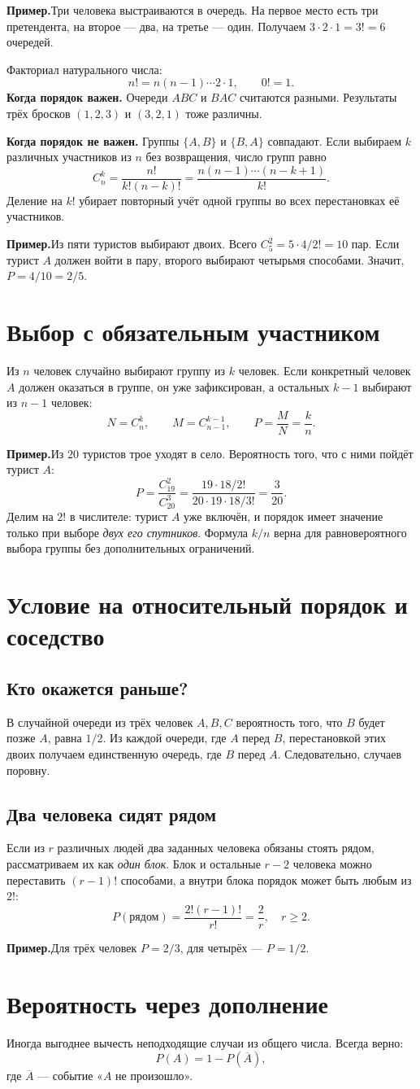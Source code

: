 \documentclass[a4paper,12pt]{article}
\newcommand{\key}[1]{\textcolor{darkaccent}{\textbf{#1}}}
\newcommand{\sample}[1]{\par\medskip\textcolor{darkaccent}{\textbf{Пример.}}\quad #1\par}
\newcommand{\sect}[1]{\section{#1}\vspace{-3pt}}
\newcommand{\subsect}[1]{\subsection*{\textcolor{darkaccent}{#1}}\vspace{-8pt}}
\begin{document}
\sample{Три человека выстраиваются в очередь. На первое место есть три претендента, на второе --- два, на третье --- один. Получаем $3\cdot2\cdot1=3!=6$ очередей.}

Факториал натурального числа:
\[
n!=n(n-1)\cdots2\cdot1,\qquad 0!=1.
\]
\key{Когда порядок важен.} Очереди $ABC$ и $BAC$ считаются разными. Результаты трёх бросков $(1,2,3)$ и $(3,2,1)$ тоже различны.

\key{Когда порядок не важен.} Группы $\{A,B\}$ и $\{B,A\}$ совпадают. Если выбираем $k$ различных участников из $n$ без возвращения, число групп равно
\[
\boxed{C_n^k=\frac{n!}{k!(n-k)!}=\frac{n(n-1)\cdots(n-k+1)}{k!}}.
\]
Деление на $k!$ убирает повторный учёт одной группы во всех перестановках её участников.

\sample{Из пяти туристов выбирают двоих. Всего $C_5^2=5\cdot4/2!=10$ пар. Если турист $A$ должен войти в пару, второго выбирают четырьмя способами. Значит, $P=4/10=2/5$.}

\clearpage
\sect{Выбор с обязательным участником}
Из $n$ человек случайно выбирают группу из $k$ человек. Если конкретный человек $A$ должен оказаться в группе, он уже зафиксирован, а остальных $k-1$ выбирают из $n-1$ человек:
\[
N=C_n^k,\qquad M=C_{n-1}^{k-1},\qquad\boxed{P=\frac{M}{N}=\frac{k}{n}}.
\]
\sample{Из $20$ туристов трое уходят в село. Вероятность того, что с ними пойдёт турист $A$:
\[
P=\frac{C_{19}^{2}}{C_{20}^{3}}=
\frac{19\cdot18/2!}{20\cdot19\cdot18/3!}=\boxed{\frac{3}{20}}.
\]
Делим на $2!$ в числителе: турист $A$ уже включён, и порядок имеет значение только при выборе \emph{двух его спутников}. Формула $k/n$ верна для равновероятного выбора группы без дополнительных ограничений.}

\sect{Условие на относительный порядок и соседство}
\subsect{Кто окажется раньше?}
В случайной очереди из трёх человек $A,B,C$ вероятность того, что $B$ будет позже $A$, равна $1/2$. Из каждой очереди, где $A$ перед $B$, перестановкой этих двоих получаем единственную очередь, где $B$ перед $A$. Следовательно, случаев поровну.

\subsect{Два человека сидят рядом}
Если из $r$ различных людей два заданных человека обязаны стоять рядом, рассматриваем их как \emph{один блок}. Блок и остальные $r-2$ человека можно переставить $(r-1)!$ способами, а внутри блока порядок может быть любым из $2!$:
\[
P(\text{рядом})=\frac{2!(r-1)!}{r!}=\boxed{\frac{2}{r}},\quad r\ge2.
\]
\sample{Для трёх человек $P=2/3$, для четырёх --- $P=1/2$.}

\clearpage
\sect{Вероятность через дополнение}
Иногда выгоднее вычесть неподходящие случаи из общего числа. Всегда верно:
\[
P(A)=1-P(\overline A),
\]
где $\overline A$ --- событие «$A$ не произошло».
\end{document}
